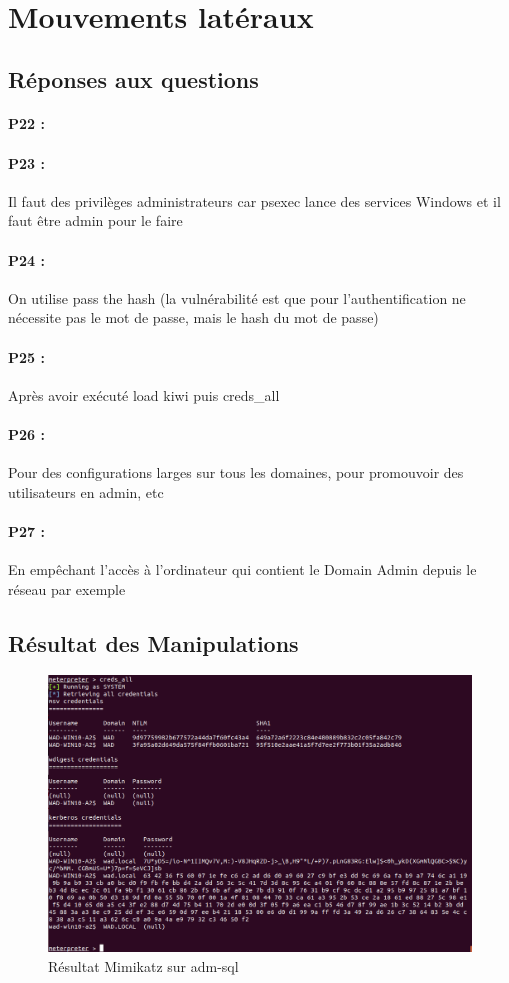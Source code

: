 \documentclass[12pt]{report} %
\begin{document}
\newpage
~
\newpage
~
\newpage
\section*{Mouvements latéraux}

\subsection*{Réponses aux questions}
\paragraph{P22 :}
\paragraph{P23 :} Il  faut des privilèges administrateurs car psexec lance des services Windows et il faut être admin pour le faire
\paragraph{P24 :} On utilise pass the hash (la vulnérabilité est que pour l'authentification ne nécessite pas le mot de passe, mais le hash du mot de passe)
\paragraph{P25 :} Après avoir exécuté load kiwi puis creds\_all 
\paragraph{P26 :} Pour des configurations larges sur tous les domaines, pour promouvoir des utilisateurs en admin, etc
\paragraph{P27 :} En empêchant l'accès à l'ordinateur qui contient le Domain Admin depuis le réseau par exemple

\newpage
\subsection*{Résultat des Manipulations}


\begin{figure}[!h]
	\includegraphics[width=17cm]{mimikatz_creds_all.PNG}
	\caption*{Résultat Mimikatz sur adm-sql}
\end{figure}
\end{document}
